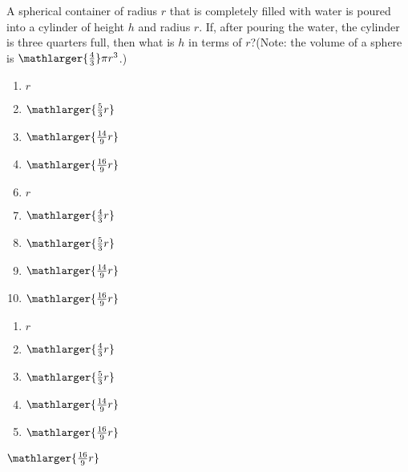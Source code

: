 





  A spherical container of radius $r$ that is completely filled with water is poured into a cylinder of height $h$ and radius $r$.  If, after pouring the water, the cylinder is three quarters full, then what is $h$ in terms of $r$?(Note: the volume of a sphere is $\mathlarger{\frac{4}{3}}\pi r^{3}$.)




\ifsat
	\begin{enumerate}[label=\Alph*)]
		\item  $r$
		\item  $\mathlarger{\frac{5}{3}r}$
		\item  $\mathlarger{\frac{14}{9}r}$ 
		\item  $\mathlarger{\frac{16}{9}r}$ %
	\end{enumerate}
\else
\fi

\ifacteven
	\begin{enumerate}[label=\textbf{\Alph*.},itemsep=\fill,align=left]
		\setcounter{enumii}{5}
		\item  $r$
		\item  $\mathlarger{\frac{4}{3}r}$
		\item  $\mathlarger{\frac{5}{3}r}$
		\addtocounter{enumii}{1}
		\item  $\mathlarger{\frac{14}{9}r}$ 
		\item  $\mathlarger{\frac{16}{9}r}$ %
	\end{enumerate}
\else
\fi

\ifactodd
	\begin{enumerate}[label=\textbf{\Alph*.},itemsep=\fill,align=left]
		\item  $r$
		\item  $\mathlarger{\frac{4}{3}r}$
		\item  $\mathlarger{\frac{5}{3}r}$
		\item  $\mathlarger{\frac{14}{9}r}$ 
		\item  $\mathlarger{\frac{16}{9}r}$ %
	\end{enumerate}
\else
\fi

\ifgridin
  $\mathlarger{\frac{16}{9}r}$ %

\else
\fi

